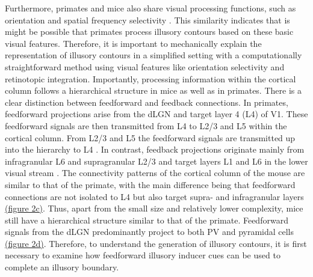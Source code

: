 \documentclass[12pt]{article}
\begin{document}
Furthermore, primates and mice also share visual processing functions, such as orientation and spatial frequency selectivity \autocite{niellHighlySelectiveReceptive2008}. This similarity indicates that is might be possible that primates process illusory contours based on these basic visual features. Therefore, it is important to mechanically explain the representation of illusory contours in a simplified setting with a computationally straightforward method using visual features like orientation selectivity and retinotopic integration. Importantly, processing information within the cortical column follows a hierarchical structure in mice as well as in primates. There is a clear distinction between feedforward and feedback connections. In primates, feedforward projections arise from the dLGN and target layer 4 (L4) of V1. These feedforward signals are then transmitted from L4 to L2/3 and L5 within the cortical column. From L2/3 and L5 the feedforward signals are transmitted up into the hierarchy to L4 \autocite{markovAnatomyHierarchyFeedforward2014}. In contrast, feedback projections originate mainly from infragranular L6 and supragranular L2/3 and target layers L1 and L6 in the lower visual stream \autocite{rocklandWhatWeKnow2019}. The connectivity patterns of the cortical column of the mouse are similar to that of the primate, with the main difference being that feedforward connections are not isolated to L4 but also target supra- and infragranular layers \hyperref[fig:Laminar_Figure]{(figure 2c)}. Thus, apart from the small size and relatively lower complexity, mice still have a hierarchical structure similar to that of the primate. Feedforward signals from the dLGN predominantly project to both PV and pyramidal cells \hyperref[fig:Laminar_Figure]{(figure 2d)}. Therefore, to understand the generation of illusory contours, it is first necessary to examine how feedforward illusory inducer cues can be  used to complete an illusory boundary. 
\end{document}
